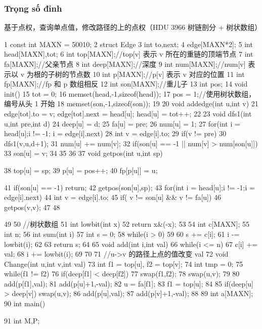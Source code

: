 \documentclass[11pt]{article}
\begin{document}
\subsubsection{Trọng số đỉnh}

\begin{Code}
     基于点权，查询单点值，修改路径的上的点权（HDU 3966 树链剖分 + 树状数组）

 1   const int MAXN = 50010;
 2   struct Edge{
 3       int to,next;
 4   }edge[MAXN*2];
 5   int head[MAXN],tot;
 6   int top[MAXN];//top[v] 表示 v 所在的重链的顶端节点
 7   int fa[MAXN];//父亲节点
 8   int deep[MAXN];//深度
 9   int num[MAXN];//num[v] 表示以 v 为根的子树的节点数
10   int p[MAXN];//p[v] 表示 v 对应的位置
11   int fp[MAXN];//fp 和 p 数组相反
12   int son[MAXN];//重儿子
13   int pos;
14   void init(){
15       tot = 0;
16       memset(head,-1,sizeof(head));
17       pos = 1;//使用树状数组，编号从头 1 开始
18       memset(son,-1,sizeof(son));
19   }
20   void addedge(int u,int v){
21       edge[tot].to = v; edge[tot].next = head[u]; head[u] = tot++;
22   }
23   void dfs1(int u,int pre,int d){
24       deep[u] = d;
25       fa[u] = pre;
26       num[u] = 1;
27       for(int i = head[u];i != -1; i = edge[i].next){
28           int v = edge[i].to;
29           if(v != pre){
30                dfs1(v,u,d+1);
31                num[u] += num[v];
32                if(son[u] == -1 || num[v] > num[son[u]])
33                    son[u] = v;
34           }
35       }
36   }
37   void getpos(int u,int sp){
38       top[u] = sp;
39       p[u] = pos++;
40       fp[p[u]] = u;


41       if(son[u] == -1) return;
42       getpos(son[u],sp);
43       for(int i = head[u];i != -1;i = edge[i].next){
44           int v = edge[i].to;
45           if( v != son[u] && v != fa[u])
46               getpos(v,v);
47       }
48   }
49
50   //树状数组
51   int lowbit(int x){
52       return x&(-x);
53   }
54   int c[MAXN];
55   int n;
56   int sum(int i){
57       int s = 0;
58       while(i > 0)
59       {
60           s += c[i];
61           i -= lowbit(i);
62       }
63       return s;
64   }
65   void add(int i,int val){
66       while(i <= n){
67           c[i] += val;
68           i += lowbit(i);
69       }
70   }
71   //u->v 的路径上点的值改变 val
72   void Change(int u,int v,int val){
73       int f1 = top[u], f2 = top[v];
74       int tmp = 0;
75       while(f1 != f2){
76           if(deep[f1] < deep[f2]){
77                swap(f1,f2);
78                swap(u,v);
79           }
80           add(p[f1],val);
81           add(p[u]+1,-val);
82           u = fa[f1];
83           f1 = top[u];
84       }
85       if(deep[u] > deep[v]) swap(u,v);
86       add(p[u],val);
87       add(p[v]+1,-val);
88   }
89   int a[MAXN];
90   int main(){
91       int M,P;


}
\end{Code}
\end{document}
